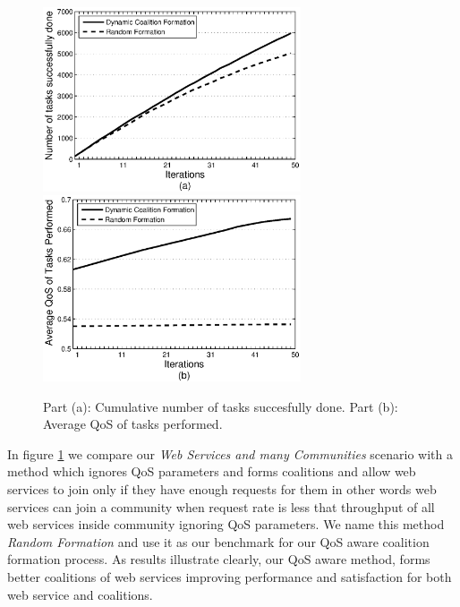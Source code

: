 \documentclass[10pt, conference, compsocconf]{IEEEtran}
\theoremstyle{plain}
\theoremstyle{definition}
\begin{document}
\begin{figure}[!t]
\centering
\includegraphics[width=3in]{s2_task_done.eps}
\includegraphics[width=3in]{s2_task_qos.eps}
\caption{Part (a): Cumulative number of tasks succesfully done. Part
(b): Average QoS of tasks performed.} \label{performancemany}
\end{figure}

In figure \ref{performancemany} we compare our \emph{Web Services and many Communities} scenario with a method which ignores QoS parameters and forms coalitions and allow web services to join only if they have enough requests for them in other words web services can join a community when request rate is less that throughput of all web services inside community ignoring QoS parameters. We name this method \emph{Random Formation} and use it as our benchmark for our QoS aware coalition formation process. As results illustrate clearly, our QoS aware method, forms better coalitions of web services improving performance and satisfaction for both web service and coalitions. 

%
%
\end{document}
